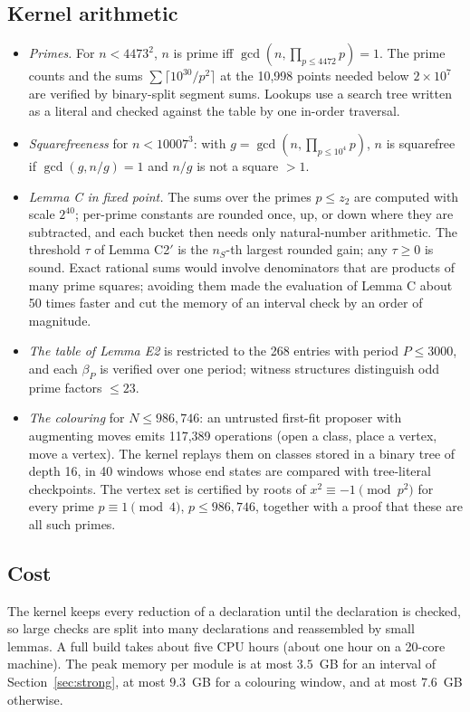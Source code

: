 \documentclass[11pt]{amsart}
\theoremstyle{definition}
\theoremstyle{remark}
\begin{document}
\subsection{Kernel arithmetic}
\begin{itemize}[leftmargin=*]
\item \emph{Primes.} For $n<4473^2$, $n$ is prime iff $\gcd(n,\prod_{p\le4472}p)=1$.
  The prime counts and the sums $\sum\lceil10^{30}/p^2\rceil$ at the 10{,}998 points
  needed below $2\times10^7$ are verified by binary-split segment sums. Lookups use
  a search tree written as a literal and checked against the table by one in-order
  traversal.
\item \emph{Squarefreeness} for $n<10007^3$: with $g=\gcd(n,\prod_{p\le10^4}p)$,
  $n$ is squarefree if $\gcd(g,n/g)=1$ and $n/g$ is not a square $>1$.
\item \emph{Lemma C in fixed point.} The sums over the primes $p\le z_2$ are computed
  with scale $2^{40}$; per-prime constants are rounded once, up, or down where they
  are subtracted, and each bucket then needs only natural-number arithmetic. The
  threshold $\tau$ of Lemma C2$'$ is the $n_S$-th largest rounded gain; any
  $\tau\ge0$ is sound. Exact rational sums would involve denominators that are
  products of many prime squares; avoiding them made the evaluation of Lemma C
  about 50 times faster and cut the memory of an interval check by an order of
  magnitude.
\item \emph{The table of Lemma E2} is restricted to the 268 entries with period
  $P\le3000$, and each $\beta_P$ is verified over one period; witness structures
  distinguish odd prime factors $\le23$.
\item \emph{The colouring} for $N\le986{,}746$: an untrusted first-fit proposer with
  augmenting moves emits 117{,}389 operations (open a class, place a vertex, move a
  vertex). The kernel replays them on classes stored in a binary tree of depth 16,
  in 40 windows whose end states are compared with tree-literal checkpoints. The
  vertex set is certified by roots of $x^2\equiv-1\pmod{p^2}$ for every prime
  $p\equiv1\pmod4$, $p\le986{,}746$, together with a proof that these are all such
  primes.
\end{itemize}

\subsection{Cost}
The kernel keeps every reduction of a declaration until the declaration is checked,
so large checks are split into many declarations and reassembled by small lemmas.
A full build takes about five CPU hours (about one hour on a 20-core machine). The
peak memory per module is at most $3.5$~GB for an interval of
Section~\ref{sec:strong}, at most $9.3$~GB for a colouring window, and at most
$7.6$~GB otherwise.
\end{document}
